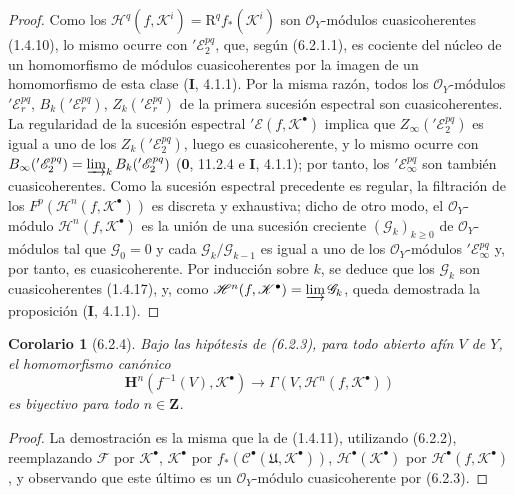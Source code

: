 \documentclass[10pt,oneside,openany]{book}
\theoremstyle{egaenv}\newtheorem*{env}{---}
\theoremstyle{egastatement}
\newtheorem*{corollary}{Corolario}
\theoremstyle{egadescription}
\newcommand{\oldpage}[2][]{\marginnote{\normalfont\scriptsize\textbf{#1}\,|\,#2}\ignorespaces}
\renewcommand{\geq}{\geqslant}
\begin{document}
\begin{proof}
Como los $\mathscr H^q(f,\mathscr K^i)=\mathrm R^q f_*(\mathscr K^i)$ son
$\mathscr O_Y$-módulos cuasicoherentes (1.4.10), lo mismo ocurre con
$'\mathscr E_2^{pq}$, que, según (6.2.1.1), es cociente del núcleo de un
homomorfismo de módulos cuasicoherentes por la imagen de un homomorfismo de
esta clase (\textbf I, 4.1.1). Por la misma razón, todos los
$\mathscr O_Y$-módulos $'\mathscr E_r^{pq}$,
$B_k('\mathscr E_r^{pq})$, $Z_k('\mathscr E_r^{pq})$ de la primera sucesión
espectral son cuasicoherentes. La regularidad de la sucesión espectral
$'\mathscr E(f,\mathscr K^\bullet)$ implica que
$Z_\infty('\mathscr E_2^{pq})$ es igual a uno de los
$Z_k('\mathscr E_2^{pq})$, luego es cuasicoherente, y lo mismo ocurre con
$B_\infty('\mathscr E_2^{pq})=\varinjlim_k B_k('\mathscr E_2^{pq})$
(\textbf 0, 11.2.4 e \textbf I, 4.1.1); por tanto, los $'\mathscr E_\infty^{pq}$ son también
cuasicoherentes. Como la sucesión espectral precedente es regular, la
filtración de los $F^p(\mathscr H^n(f,\mathscr K^\bullet))$ es discreta y
exhaustiva; dicho de otro modo, el $\mathscr O_Y$-módulo
$\mathscr H^n(f,\mathscr K^\bullet)$ es la unión de una sucesión creciente
$(\mathscr G_k)_{k\geq0}$ de $\mathscr O_Y$-módulos tal que
$\mathscr G_0=0$ y cada $\mathscr G_k/\mathscr G_{k-1}$ es igual a uno de los
$\mathscr O_Y$-módulos $'\mathscr E_\infty^{pq}$ y, por tanto, es
cuasicoherente. Por inducción sobre $k$, se deduce que los $\mathscr G_k$ son
cuasicoherentes (1.4.17), y, como
$\mathscr H^n(f,\mathscr K^\bullet)=\varinjlim\mathscr G_k$, queda demostrada
la proposición (\textbf I, 4.1.1).
\end{proof}

\oldpage[III]{140}

\begin{corollary}[6.2.4]
Bajo las hipótesis de (6.2.3), para todo abierto afín $V$ de $Y$, el
homomorfismo canónico
\[
  \mathbf H^n(f^{-1}(V),\mathscr K^\bullet)
  \longrightarrow
  \Gamma(V,\mathscr H^n(f,\mathscr K^\bullet))
  \tag{6.2.4.1}\label{III.6.2.4.1.fr}
\]
es biyectivo para todo $n\in\mathbf Z$.
\end{corollary}

\begin{proof}
La demostración es la misma que la de (1.4.11), utilizando (6.2.2),
reemplazando $\mathscr F$ por $\mathscr K^\bullet$,
$\mathscr K^\bullet$ por
$f_*(\mathscr C^\bullet(\mathfrak U,\mathscr K^\bullet))$,
$\mathscr H^\bullet(\mathscr K^\bullet)$ por
$\mathscr H^\bullet(f,\mathscr K^\bullet)$, y observando que este último es un
$\mathscr O_Y$-módulo cuasicoherente por (6.2.3).
\end{proof}
\end{document}
